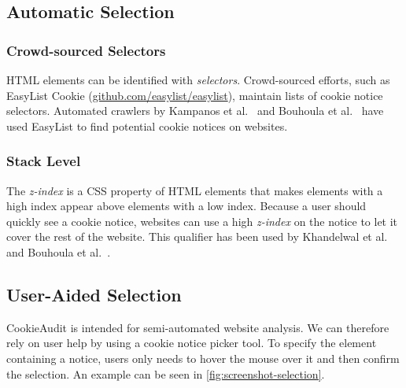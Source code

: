 \subsection{Automatic Selection}
\subsubsection{Crowd-sourced Selectors}
HTML elements can be identified with \emph{selectors}. 
Crowd-sourced efforts, such as EasyList Cookie (\href{https://github.com/easylist/easylist}{github.com/easylist/easylist}), maintain lists of cookie notice selectors.
Automated crawlers by Kampanos et al.~\cite{kampanos2021accept} and Bouhoula et al.~\cite{bouhoula2023automated} have used EasyList to find potential cookie notices on websites.

\subsubsection{Stack Level}
The \emph{z-index} is a CSS property of HTML elements that makes elements with a high index appear above elements with a low index. 
Because a user should quickly see a cookie notice, websites can use a high \emph{z-index} on the notice to let it cover the rest of the website. 
This qualifier has been used by Khandelwal et al.~\cite{khandelwal2023automated} and Bouhoula et al.~\cite{bouhoula2023automated}.

\subsection{User-Aided Selection} \label{subsec:user-aided-selection}
CookieAudit is intended for semi-automated website analysis.
We can therefore rely on user help by using a cookie notice picker tool.
To specify the element containing a notice, users only needs to hover the mouse over it and then confirm the selection. 
An example can be seen in \cref{fig:screenshot-selection}.

